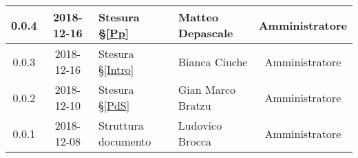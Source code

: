 \begin{center}
\begin{tabularx}{\textwidth}{|c|c|X|X|c|}
			\hline
			0.0.4 & 2018-12-16 & Stesura \S\ref{Pp} & Matteo Depascale & Amministratore\\
			\hline
			0.0.3 & 2018-12-16 & Stesura \S\ref{Intro} & Bianca Ciuche & Amministratore\\
			\hline
			0.0.2 & 2018-12-10 & Stesura \S\ref{PdS} & Gian Marco Bratzu & Amministratore\\	
			\hline
			0.0.1 & 2018-12-08 & Struttura documento  & Ludovico Brocca & Amministratore\\
			\hline
	\end{tabularx}
	\end{center}

\newpage